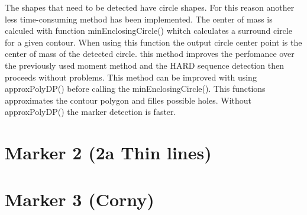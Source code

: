 The shapes that need to be detected have circle shapes. For this reason another less time-consuming 
method has been implemented. The center of mass is calculed with function minEnclosingCircle() whitch calculates
a surround circle for a given contour. When using this function the output circle center point is the
center of mass of the detected circle. this method improves the perfomance over the previously used 
moment method and the HARD sequence detection then proceeds without problems. This method can be improved 
with using approxPolyDP() before calling the minEnclosingCircle(). This functions approximates the contour
polygon and filles possible holes. Without approxPolyDP() the marker detection is faster.
\newpage
\section{Marker 2 (2a Thin lines)}

\newpage
\section{Marker 3 (Corny)}
